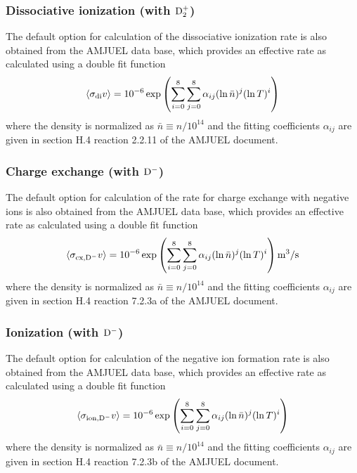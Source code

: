 \documentclass[amsmath,amssymb,a4]{revtex4-2}
\begin{document}
\subsubsection*{Dissociative ionization (with ${\rm D_2^+}$)}
The default option for calculation of the dissociative ionization rate is also obtained from the AMJUEL data base, which provides an effective rate as calculated using a double fit function
\begin{equation}\label{Dissociative ionization}
    \langle\sigma_{\rm di} v\rangle = 10^{-6} \exp\left( \sum_{i=0}^8\sum_{j=0}^8 \alpha_{ij} (\ln \bar n)^j (\ln T)^i \right)  %
\end{equation}
where the density is normalized as $\bar n \equiv n / 10^{14}$ and the fitting coefficients $\alpha_{ij}$ are given in section {H.4} reaction {2.2.11} of the AMJUEL document.


\subsubsection*{Charge exchange (with ${\rm D^-}$)}
The default option for calculation of the rate for charge exchange with negative ions is also obtained from the AMJUEL data base, which provides an effective rate as calculated using a double fit function
\begin{equation}\label{Charge exchange Dmin}
    \langle\sigma_{\rm cx,{\rm D}^-} v\rangle = 10^{-6} \exp\left( \sum_{i=0}^8\sum_{j=0}^8 \alpha_{ij} (\ln \bar n)^j (\ln T)^i \right)  {\rm m}^3/{\rm s}
\end{equation}
where the density is normalized as $\bar n \equiv n / 10^{14}$ and the fitting coefficients $\alpha_{ij}$ are given in section {H.4} reaction {7.2.3a} of the AMJUEL document.


\subsubsection*{Ionization (with ${\rm D^-}$) }
The default option for calculation of the negative ion formation rate is also obtained from the AMJUEL data base, which provides an effective rate as calculated using a double fit function
\begin{equation}\label{Ionization Dmin}
    \langle\sigma_{\rm ion,{\rm D}^-} v\rangle = 10^{-6} \exp\left( \sum_{i=0}^8\sum_{j=0}^8 \alpha_{ij} (\ln \bar n)^j (\ln T)^i \right) %
\end{equation}
where the density is normalized as $\bar n \equiv n / 10^{14}$ and the fitting coefficients $\alpha_{ij}$ are given in section {H.4} reaction {7.2.3b} of the AMJUEL document.
\end{document}
